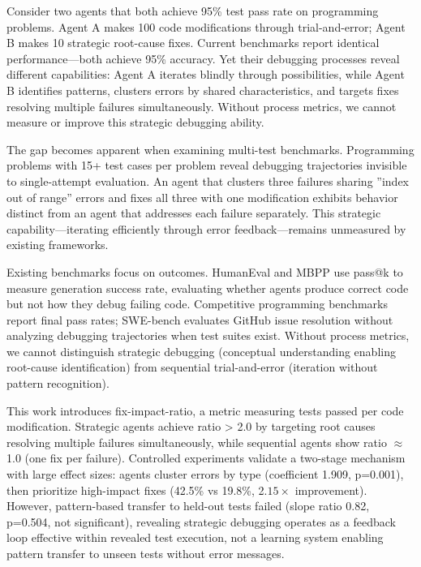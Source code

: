 
Consider two agents that both achieve 95\% test pass rate on programming problems. Agent A makes 100 code modifications through trial-and-error; Agent B makes 10 strategic root-cause fixes. Current benchmarks report identical performance---both achieve 95\% accuracy. Yet their debugging processes reveal different capabilities: Agent A iterates blindly through possibilities, while Agent B identifies patterns, clusters errors by shared characteristics, and targets fixes resolving multiple failures simultaneously. Without process metrics, we cannot measure or improve this strategic debugging ability.

The gap becomes apparent when examining multi-test benchmarks. Programming problems with 15+ test cases per problem reveal debugging trajectories invisible to single-attempt evaluation. An agent that clusters three failures sharing ''index out of range'' errors and fixes all three with one modification exhibits behavior distinct from an agent that addresses each failure separately. This strategic capability---iterating efficiently through error feedback---remains unmeasured by existing frameworks.

Existing benchmarks focus on outcomes. HumanEval and MBPP use pass@k to measure generation success rate, evaluating whether agents produce correct code but not how they debug failing code. Competitive programming benchmarks report final pass rates; SWE-bench evaluates GitHub issue resolution without analyzing debugging trajectories when test suites exist. Without process metrics, we cannot distinguish strategic debugging (conceptual understanding enabling root-cause identification) from sequential trial-and-error (iteration without pattern recognition).

This work introduces fix-impact-ratio, a metric measuring tests passed per code modification. Strategic agents achieve ratio > 2.0 by targeting root causes resolving multiple failures simultaneously, while sequential agents show ratio $\approx$ 1.0 (one fix per failure). Controlled experiments validate a two-stage mechanism with large effect sizes: agents cluster errors by type (coefficient 1.909, p=0.001), then prioritize high-impact fixes (42.5\% vs 19.8\%, 2.$15\times$ improvement). However, pattern-based transfer to held-out tests failed (slope ratio 0.82, p=0.504, not significant), revealing strategic debugging operates as a feedback loop effective within revealed test execution, not a learning system enabling pattern transfer to unseen tests without error messages.

